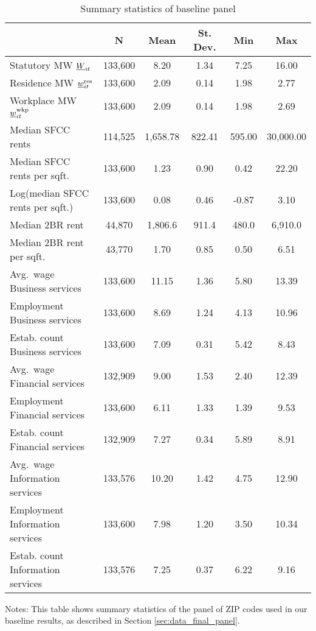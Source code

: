 \begin{table}[hbt!] \centering
    \caption{Summary statistics of baseline panel}
    \label{tab:stats_est_panel}
    \begin{tabular}{@{}lccccc@{}}
        \toprule
                                          & \multicolumn{1}{c}{N} 
                                          & \multicolumn{1}{c}{Mean} 
                                          & \multicolumn{1}{c}{St. Dev.} 
                                          & \multicolumn{1}{c}{Min} 
                                          & \multicolumn{1}{c}{Max}                 \\ \midrule
        Statutory MW $\underline{W}_{it}$           & 133,600  & 8.20  & 1.34  & 7.25  & 16.00  \\
        Residence MW $\underline{w}^{\text{res}}_{it}$    & 133,600  & 2.09  & 0.14  & 1.98  & 2.77  \\
        Workplace MW $\underline{w}^{\text{wkp}}_{it}$    & 133,600  & 2.09  & 0.14  & 1.98  & 2.69  \\
        Median SFCC rents                 & 114,525  & 1,658.78  & 822.41  & 595.00  & 30,000.00  \\
        Median SFCC rents per sqft.       & 133,600  & 1.23  & 0.90  & 0.42  & 22.20  \\
        Log(median SFCC rents per sqft.)  & 133,600  & 0.08  & 0.46  & -0.87  & 3.10  \\
        Median 2BR rent                   & 44,870   & 1,806.6 & 911.4 & 480.0 & 6,910.0  \\
        Median 2BR rent per sqft.         & 43,770   & 1.70  & 0.85  & 0.50  & 6.51  \\
        Avg.\ wage Business services      & 133,600  & 11.15  & 1.36  & 5.80  & 13.39  \\
        Employment Business services      & 133,600  & 8.69  & 1.24  & 4.13  & 10.96  \\
        Estab. count Business services    & 133,600  & 7.09  & 0.31  & 5.42  & 8.43  \\
        Avg.\ wage Financial services     & 132,909  & 9.00  & 1.53  & 2.40  & 12.39  \\
        Employment Financial services     & 133,600  & 6.11  & 1.33  & 1.39  & 9.53  \\
        Estab. count Financial services   & 132,909  & 7.27  & 0.34  & 5.89  & 8.91  \\
        Avg.\ wage Information services   & 133,576  & 10.20  & 1.42  & 4.75  & 12.90  \\
        Employment Information services   & 133,600  & 7.98  & 1.20  & 3.50  & 10.34  \\
        Estab. count Information services & 133,576  & 7.25  & 0.37  & 6.22  & 9.16  \\ \bottomrule
    \end{tabular}

    \begin{minipage}{.95\textwidth} \footnotesize
        \vspace{2mm}
        Notes: This table shows summary statistics of the panel of ZIP codes 
        used in our baseline results, as described in Section 
        \ref{sec:data_final_panel}.
    \end{minipage}
\end{table}
